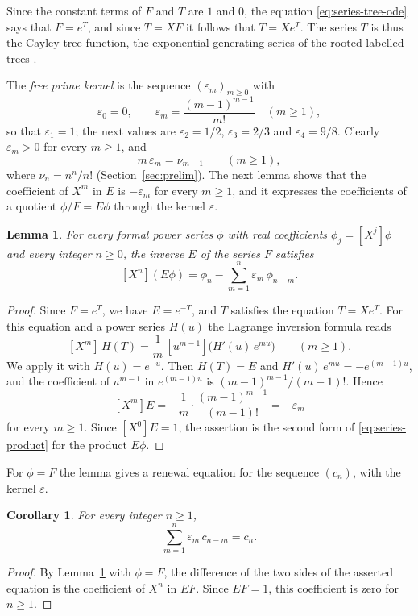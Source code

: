 \documentclass{amsart}
\newtheorem{lemma}[theorem]{Lemma}
\newtheorem{corollary}[theorem]{Corollary}
\theoremstyle{definition}
\theoremstyle{remark}
\numberwithin{equation}{section}
\begin{document}
Since the constant terms of $F$ and $T$ are $1$ and $0$, the equation
\eqref{eq:series-tree-ode} says that $F=e^{T}$, and since $T=XF$ it follows
that $T=Xe^{T}$. The series $T$ is thus the Cayley tree function, the
exponential generating series of the rooted labelled trees
\cite[Section~II.5.1]{flajoletsedgewick2009}.

The \emph{free prime kernel} is the sequence $(\varepsilon_m)_{m\ge0}$ with
\[
\varepsilon_0=0,\qquad
\varepsilon_m=\frac{(m-1)^{m-1}}{m!}\quad(m\ge1),
\]
so that $\varepsilon_1=1$; the next values are
$\varepsilon_2=1/2$, $\varepsilon_3=2/3$ and $\varepsilon_4=9/8$. Clearly
$\varepsilon_m>0$ for every $m\ge1$, and
\[
m\,\varepsilon_m=\nu_{m-1}\qquad(m\ge1),
\]
where $\nu_n=n^n/n!$ (Section~\ref{sec:prelim}). The next lemma shows that
the coefficient of $X^m$ in $E$ is $-\varepsilon_m$ for every $m\ge1$, and
it expresses the coefficients of a quotient $\phi/F=E\phi$ through the
kernel $\varepsilon$.

\begin{lemma}\label{lem:inverseseries}
For every formal power series $\phi$ with real coefficients
$\phi_j=[X^j]\phi$ and every integer $n\ge0$, the inverse $E$ of the series
$F$ satisfies
\[
[X^n](E\phi)=\phi_n-\sum_{m=1}^{n}\varepsilon_m\,\phi_{n-m} .
\]
\end{lemma}

\begin{proof}
Since $F=e^{T}$, we have $E=e^{-T}$, and $T$ satisfies the equation
$T=Xe^{T}$. For this equation and a power series $H(u)$ the Lagrange
inversion formula \cite[Theorem~A.2]{flajoletsedgewick2009} reads
\[
[X^m]\,H(T)=\frac1m\,[u^{m-1}]\bigl(H'(u)\,e^{mu}\bigr)\qquad(m\ge1).
\]
We apply it with $H(u)=e^{-u}$. Then $H(T)=E$ and
$H'(u)\,e^{mu}=-e^{(m-1)u}$, and the coefficient of $u^{m-1}$ in
$e^{(m-1)u}$ is $(m-1)^{m-1}/(m-1)!$. Hence
\[
[X^m]E=-\frac1m\cdot\frac{(m-1)^{m-1}}{(m-1)!}=-\varepsilon_m
\]
for every $m\ge1$. Since $[X^0]E=1$, the assertion is the second form of
\eqref{eq:series-product} for the product $E\phi$.
\end{proof}

For $\phi=F$ the lemma gives a renewal equation for the sequence $(c_n)$,
with the kernel $\varepsilon$.

\begin{corollary}\label{cor:crenewal}
For every integer $n\ge1$,
\[
\sum_{m=1}^{n}\varepsilon_m\,c_{n-m}=c_n .
\]
\end{corollary}

\begin{proof}
By Lemma~\ref{lem:inverseseries} with $\phi=F$, the difference of the two
sides of the asserted equation is the coefficient of $X^n$ in $EF$. Since
$EF=1$, this coefficient is zero for $n\ge1$.
\end{proof}
\end{document}
